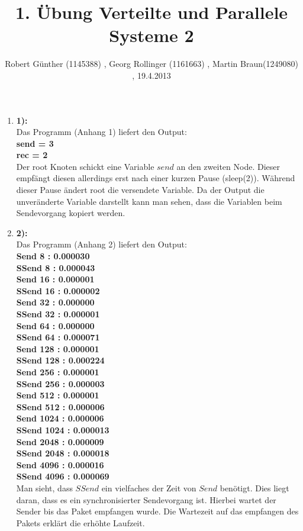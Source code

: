 ﻿\documentclass[10pt,a4paper]{article} %
\title{1. Übung Verteilte und Parallele Systeme 2}
\author{ Robert Günther (1145388) , Georg Rollinger (1161663) , Martin Braun(1249080) , 19.4.2013}
\date{}
\begin{document}
\maketitle
\begin{enumerate}

\item[]{\textbf{1):} \\
   Das Programm (Anhang 1) liefert den Output:\\
   \textbf{
   send = 3\\
	rec = 2}\\
	Der root Knoten schickt eine Variable $send$ an den zweiten Node. Dieser empfängt diesen allerdings erst nach einer kurzen Pause (sleep(2)). Während dieser Pause ändert root die versendete Variable. Da der Output die unveränderte Variable darstellt kann man sehen, dass die Variablen beim Sendevorgang kopiert werden.
}
\item[]{\textbf{2):} \\
	Das Programm (Anhang 2) liefert den Output:\\
	\textbf{
	Send 8 : 0.000030\\
	SSend 8 : 0.000043\\
	Send 16 : 0.000001\\
	SSend 16 : 0.000002\\
	Send 32 : 0.000000\\
	SSend 32 : 0.000001\\
	Send 64 : 0.000000\\
	SSend 64 : 0.000071\\
	Send 128 : 0.000001\\
	SSend 128 : 0.000224\\
	Send 256 : 0.000001\\
	SSend 256 : 0.000003\\
	Send 512 : 0.000001\\
	SSend 512 : 0.000006\\
	Send 1024 : 0.000006\\
	SSend 1024 : 0.000013\\
	Send 2048 : 0.000009\\
	SSend 2048 : 0.000018\\
	Send 4096 : 0.000016\\
	SSend 4096 : 0.000069\\
	}
Man sieht, dass $SSend$ ein vielfaches der Zeit von $Send$ benötigt. Dies liegt daran, dass es ein synchronisierter Sendevorgang ist. Hierbei wartet der Sender bis das Paket empfangen wurde. Die Wartezeit auf das empfangen des Pakets erklärt die erhöhte Laufzeit.
}


\end{enumerate}
\end{document}
